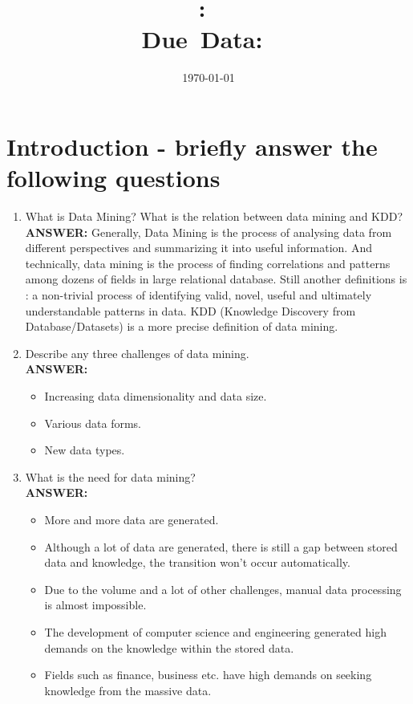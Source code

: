 \documentclass{article}
\title{\textbf{\hmwkClass:\ 
      \hmwkTitle}\\\normalsize\small{Due\ Data:\
    \hmwkDueDate}}
\date{\today}
\author{\textbf{\hmwkAuthorName}}
\begin{document}
\maketitle

\section{Introduction - briefly answer the following questions}
\begin{enumerate}
\item What is Data Mining? What is the relation between data mining and
  KDD? \\

\textbf{ANSWER:} Generally, Data Mining is the process of analysing data
from different perspectives and summarizing it into useful
information. And technically, data mining is the process of finding
correlations and patterns among dozens of fields in large relational
database. Still another definitions is : a non-trivial process of
identifying valid, novel, useful and ultimately understandable patterns
in data. KDD (Knowledge Discovery from Database/Datasets) is a more
precise definition of data mining. 
\item Describe any three challenges of data mining. \\

\textbf{ANSWER:} 
\begin{itemize}
\item Increasing data dimensionality and data size. 
\item Various data forms. 
\item New data types. 
\end{itemize}

\item What is the need for data mining? \\

\textbf{ANSWER:} 
\begin{itemize}
\item More and more data are generated. 
\item Although a lot of data are generated, there is still a gap between
  stored data and knowledge, the transition won't occur automatically. 
\item Due to the volume and a lot of other challenges, manual data
  processing is almost impossible. 
\item The development of computer science and engineering generated
  high demands on the knowledge within the stored data. 
\item Fields such as finance, business etc. have high demands on seeking
  knowledge from the massive data. 
\end{itemize}
\end{enumerate}
\end{document}
